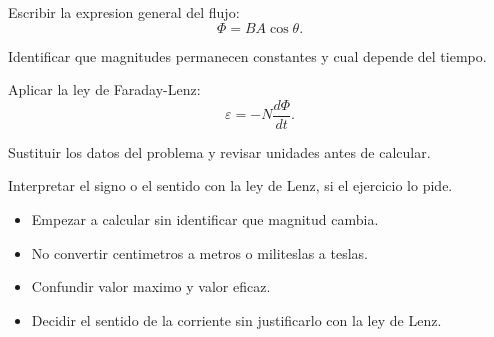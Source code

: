 \documentclass[11pt,a4paper]{article}
\begin{document}


\begin{solutionSteps}
  \item Escribir la expresion general del flujo:
  \[
    \Phi = BA\cos\theta.
  \]

  \item Identificar que magnitudes permanecen constantes y cual depende del tiempo.

  \item Aplicar la ley de Faraday-Lenz:
  \[
    \varepsilon = -N\frac{d\Phi}{dt}.
  \]

  \item Sustituir los datos del problema y revisar unidades antes de calcular.

  \item Interpretar el signo o el sentido con la ley de Lenz, si el ejercicio lo pide.
\end{solutionSteps}


\begin{itemize}
  \item Empezar a calcular sin identificar que magnitud cambia.
  \item No convertir centimetros a metros o militeslas a teslas.
  \item Confundir valor maximo y valor eficaz.
  \item Decidir el sentido de la corriente sin justificarlo con la ley de Lenz.
\end{itemize}

\end{document}
